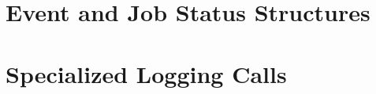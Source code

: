 \documentclass{egee}
\begin{document}

\appendix
\section{Event and Job Status Structures}
\label{a:events}
\section{Specialized Logging Calls}
\label{a:special}
\end{document}
